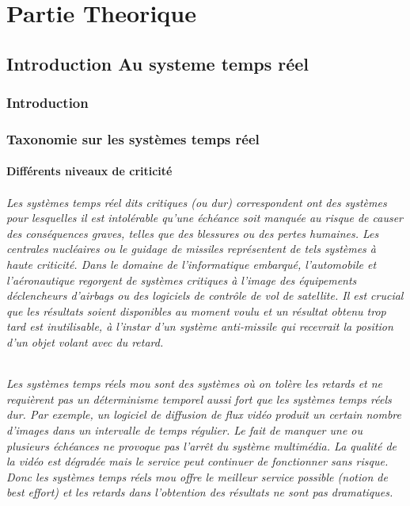 \part{Partie Theorique}
\chapter{Introduction Au systeme temps réel}
\section{Introduction}
\section{Taxonomie sur les systèmes temps réel}
\subsection*{Différents niveaux de criticité}
\paragraph
{Les systèmes temps réel dits critiques (ou dur) correspondent ont des systèmes pour lesquelles il est intolérable qu’une échéance soit manquée au risque de causer des conséquences graves, telles que des blessures ou des pertes humaines. Les centrales nucléaires ou le guidage de missiles représentent de tels systèmes à haute criticité. Dans le domaine de l’informatique embarqué, l’automobile et l’aéronautique regorgent de systèmes critiques à l’image des équipements déclencheurs d’airbags ou des logiciels de contrôle de vol de satellite. Il est crucial que les résultats soient disponibles au moment voulu et un résultat obtenu trop tard est inutilisable, à l’instar d’un système anti-missile qui recevrait la position d’un objet volant avec du retard.}

\paragraph
{Les systèmes temps réels mou sont des systèmes où on tolère les retards et ne requièrent pas un déterminisme temporel aussi fort que les systèmes temps réels dur.
Par exemple, un logiciel de diffusion de flux vidéo produit un certain nombre d’images dans un intervalle de temps régulier. Le fait de manquer une ou plusieurs échéances ne provoque pas l’arrêt du système multimédia. La qualité de la vidéo est dégradée mais le service peut continuer de fonctionner sans risque. Donc les systèmes temps réels mou  offre le  meilleur service possible (notion de best eﬀort) et les retards dans l’obtention des résultats ne sont pas dramatiques.}

